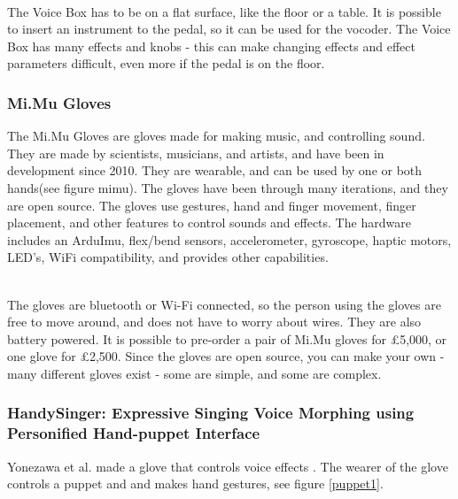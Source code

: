 \begin{minipage}{\linewidth}%
\label{voice_box}
\end{minipage}\\

The Voice Box has to be on a flat surface, like the floor or a table. It is possible to insert an instrument to the pedal, so it can be used for the vocoder. The Voice Box has many effects and knobs - this can make changing effects and effect parameters difficult, even more if the pedal is on the floor.

\subsubsection{Mi.Mu Gloves}

The Mi.Mu Gloves are gloves made for making music, and controlling sound\citep{Mimu}. They are made by scientists, musicians, and artists, and have been in development since 2010. They are wearable, and can be used by one or both hands(see figure mimu). The gloves have been through many iterations, and they are open source. The gloves use gestures, hand and finger movement, finger placement, and other features to control sounds and effects. The hardware includes an ArduImu, flex/bend sensors, accelerometer, gyroscope, haptic motors, LED's, WiFi compatibility, and provides other capabilities.\\

\begin{minipage}{\linewidth}%
\label{mimu}
\end{minipage}\\

The gloves are bluetooth or Wi-Fi connected, so the person using the gloves are free to move around, and does not have to worry about wires. They are also battery powered. It is possible to pre-order a pair of Mi.Mu gloves for £5,000, or one glove for £2,500. 
Since the gloves are open source, you can make your own - many different gloves exist - some are simple, and some are complex.

\subsubsection{HandySinger: Expressive Singing Voice Morphing using Personified Hand-puppet Interface}
Yonezawa et al. made a glove that controls voice effects \citep{Yonezawa_2005}. The wearer of the glove controls a puppet and and makes hand gestures, see figure \ref{puppet1}. 

